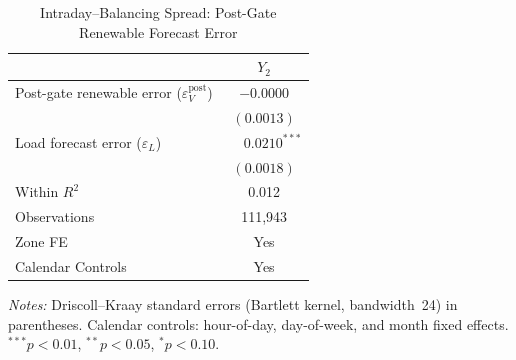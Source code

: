 \begin{table}[htbp]
\centering
\caption{Intraday--Balancing Spread: Post-Gate Renewable Forecast Error}
\label{tab:3}
\begin{threeparttable}
\begin{tabularx}{\linewidth}{>{\raggedright\arraybackslash}Xc}
\toprule
 & $Y_2$ \\
\midrule
Post-gate renewable error ($\varepsilon_V^{\mathrm{post}}$) & $-0.0000$ \\
 & $(0.0013)$ \\[0.4ex]
Load forecast error ($\varepsilon_L$) & $\phantom{-}0.0210^{***}$ \\
 & $(0.0018)$ \\
\midrule
Within $R^2$ & 0.012 \\
Observations & 111,943 \\
Zone FE & Yes \\
Calendar Controls & Yes \\
\bottomrule
\end{tabularx}
\begin{tablenotes}[flushleft]
\footnotesize
\item \textit{Notes:} Driscoll--Kraay standard errors (Bartlett kernel, bandwidth~24) in parentheses. Calendar controls: hour-of-day, day-of-week, and month fixed effects. $^{***}p<0.01$, $^{**}p<0.05$, $^{*}p<0.10$.
\end{tablenotes}
\end{threeparttable}
\end{table}

